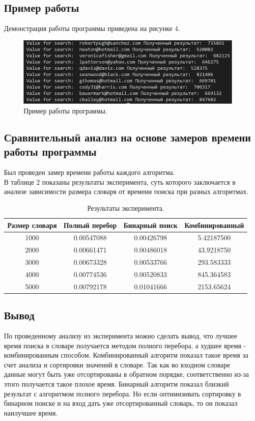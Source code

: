 \documentclass[a4paper, 12pt]{article}
\begin{document}
	\subsection{Пример работы}
	\hspace*{5mm} Демонстрация работы программы приведена на рисунке 4.
	\begin{figure}[h]
		\centering \includegraphics[scale=0.9]{r}
		\centering\caption{Пример работы программы.}
	\end{figure}
	\clearpage
	\newpage
	\subsection{Сравнительный анализ на основе замеров времени работы программы}
	Был проведен замер времени работы каждого алгоритма.
	\\ \hspace*{5mm} В таблице 2 показаны результаты эксперимента, суть которого заключается в анализе зависимости размера словаря от времени поиска при разных алгоритмах.
	\begin{table}[h]
		\centering
		\caption{Результаты эксперимента.\\}
		\begin{tabular}{ | c | c | c | c |}
			\hline
			Размер словаря & Полный перебор & Бинарный поиск & Комбинированный  \\ \hline
			1000 & 0.00547088 & 0.00426798 &  5.42187500\\ \hline
			2000 & 0.00661471 & 0.00486018 &  43.9218750\\ \hline
			3000 & 0.00673328 & 0.00533766 &  293.583333\\ \hline
			4000 & 0.00774536 & 0.00520833 &  845.364583\\ \hline
			5000 & 0.00792178 & 0.01041666 &  2153.65624\\ \hline
		\end{tabular}
	\end{table}
	
	\subsection{Вывод}
	\hspace*{5mm} По проведенному анализу из  эксперимента можно сделать вывод, что лучшее время поиска в словаре получается методом полного перебора, а худшее время - комбинированным способом. Комбинированный алгоритм показал такое время за счет анализа и сортировки значений в словаре. Так как во входном словаре данные могут быть уже отсортированы в обратном порядке, соответственно из-за этого получается такое плохое время. Бинарный алгоритм показал близкий результат с алгоритмом полного перебора. Но если оптимизивать сортировку в бинарном поиске и на вход дать уже отсортированный словарь, то он показал наилучшее время. 
	\clearpage
	\newpage
\end{document}
